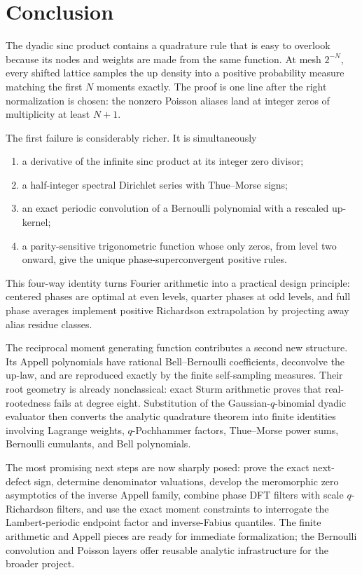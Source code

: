 \documentclass[11pt,oneside]{article}
\numberwithin{equation}{section}
\theoremstyle{definition}
\theoremstyle{remark}
\begin{document}
\section{Conclusion}
\label{p3:sec:conclusion}

The dyadic sinc product contains a quadrature rule that is easy to overlook because its nodes and weights are made from the same function.  At mesh $2^{-N}$, every shifted lattice samples the up density into a positive probability measure matching the first $N$ moments exactly.  The proof is one line after the right normalization is chosen: the nonzero Poisson aliases land at integer zeros of multiplicity at least $N+1$.

The first failure is considerably richer.  It is simultaneously
\begin{enumerate}
\item a derivative of the infinite sinc product at its integer zero divisor;
\item a half-integer spectral Dirichlet series with Thue--Morse signs;
\item an exact periodic convolution of a Bernoulli polynomial with a rescaled up-kernel;
\item a parity-sensitive trigonometric function whose only zeros, from level two onward, give the unique phase-superconvergent positive rules.
\end{enumerate}
This four-way identity turns Fourier arithmetic into a practical design principle: centered phases are optimal at even levels, quarter phases at odd levels, and full phase averages implement positive Richardson extrapolation by projecting away alias residue classes.

The reciprocal moment generating function contributes a second new structure.  Its Appell polynomials have rational Bell--Bernoulli coefficients, deconvolve the up-law, and are reproduced exactly by the finite self-sampling measures.  Their root geometry is already nonclassical: exact Sturm arithmetic proves that real-rootedness fails at degree eight.  Substitution of the Gaussian-$q$-binomial dyadic evaluator then converts the analytic quadrature theorem into finite identities involving Lagrange weights, $q$-Pochhammer factors, Thue--Morse power sums, Bernoulli cumulants, and Bell polynomials.

The most promising next steps are now sharply posed: prove the exact next-defect sign, determine denominator valuations, develop the meromorphic zero asymptotics of the inverse Appell family, combine phase DFT filters with scale $q$-Richardson filters, and use the exact moment constraints to interrogate the Lambert-periodic endpoint factor and inverse-Fabius quantiles.  The finite arithmetic and Appell pieces are ready for immediate formalization; the Bernoulli convolution and Poisson layers offer reusable analytic infrastructure for the broader \repoPartl{} project.
\end{document}
